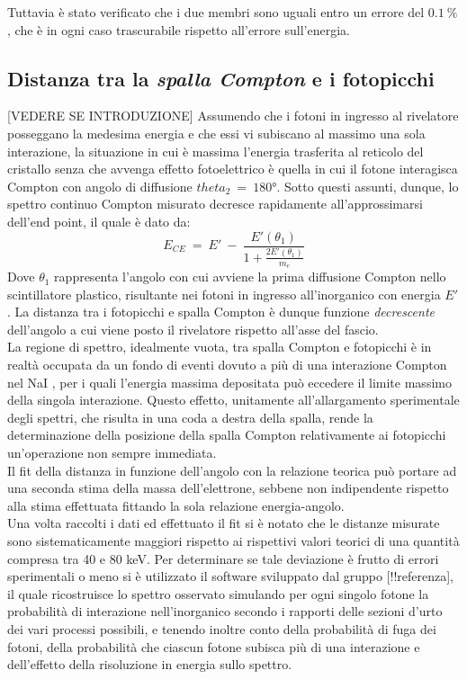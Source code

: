 \documentclass[8pt]{extarticle}
\begin{document}
Tuttavia è stato verificato che i due membri sono uguali entro un errore del $0.1 \ \%$, che è in ogni caso trascurabile rispetto all'errore sull'energia.

\subsection{Distanza tra la \textit{spalla Compton} e i fotopicchi}
[VEDERE SE INTRODUZIONE] Assumendo che i fotoni in ingresso al rivelatore posseggano la medesima energia e che essi vi subiscano al massimo una sola interazione, la situazione in cui è massima l'energia trasferita al reticolo del cristallo senza che avvenga effetto fotoelettrico è quella in cui il fotone interagisca Compton con angolo di diffusione $theta_2 \ = \ 180°$. Sotto questi assunti, dunque, lo spettro continuo Compton misurato decresce rapidamente all'approssimarsi dell'end point, il quale è dato da:
\begin{equation}
E_{CE} \ = \ E' \ - \ \frac{E'(\theta_1)}{1+\frac{2E'(\theta_1)}{m_e}}     \nonumber
\end{equation}
Dove $\theta_1$ rappresenta l'angolo con cui avviene la prima diffusione Compton nello scintillatore plastico, risultante nei fotoni in ingresso all'inorganico con energia $E'$.
La distanza tra i fotopicchi e spalla Compton è dunque funzione \textit{decrescente} dell'angolo a cui viene posto il rivelatore rispetto all'asse del fascio.\\
La regione di spettro, idealmente vuota, tra spalla Compton e fotopicchi è in realtà occupata da un fondo di eventi dovuto a più di una interazione Compton nel NaI , per i quali l'energia massima depositata può eccedere il limite massimo della singola interazione. 
Questo effetto, unitamente all'allargamento sperimentale degli spettri, che risulta in una coda a destra della spalla, rende la determinazione della posizione della spalla Compton relativamente ai fotopicchi un'operazione non sempre immediata. \\
Il fit della distanza in funzione dell'angolo con la relazione teorica può portare ad una seconda stima della massa dell'elettrone, sebbene non indipendente rispetto alla stima effettuata fittando la sola relazione energia-angolo.\\
Una volta raccolti i dati ed effettuato il fit si è notato che le distanze misurate sono sistematicamente maggiori rispetto ai rispettivi valori teorici di una quantità compresa tra 40 e 80 keV. Per determinare se tale deviazione è frutto di errori sperimentali o meno si è utilizzato il software sviluppato dal gruppo [!!referenza], il quale ricostruisce lo spettro osservato simulando per ogni singolo fotone la probabilità di interazione nell'inorganico secondo i rapporti delle sezioni d'urto dei vari processi possibili, e tenendo inoltre conto della probabilità di fuga dei fotoni, della probabilità che ciascun fotone subisca più di una interazione e dell'effetto della risoluzione in energia sullo spettro.\\
\end{document}
